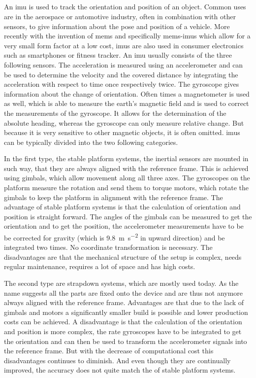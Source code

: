 \subsection{}
An \gls{imu} is used to track the orientation and position of an object.
Common uses are in the aerospace or automotive industry, often in combination with other sensors, to give information about the pose and position of a vehicle.
More recently with the invention of \gls{mems} and specifically \gls{mems}-\gls{imu}s which allow for a very small form factor at a low cost, \gls{imu}s are also used in consumer electronics such as smartphones or fitness tracker.
An \gls{imu} usually consists of the three following sensors.
The acceleration is measured using an accelerometer and can be used to determine the velocity and the covered distance by integrating the acceleration with respect to time once respectively twice.
The gyroscope gives information about the change of orientation.
Often times a magnetometer is used as well, which is able to measure the earth's magnetic field and is used to correct the measurements of the gyroscope.
It allows for the determination of the absolute heading, whereas the gyroscope can only measure relative change. But because it is very sensitive to other magnetic objects, it is often omitted.
\gls{imu}s can be typically divided into the two following categories.

In the first type, the stable platform systems, the inertial sensors are mounted in such way, that they are always aligned with the reference frame.
This is achieved using gimbals, which allow movement along all three axes.
The gyroscopes on the platform measure the rotation and send them to torque motors, which rotate the gimbals to keep the platform in alignment with the reference frame.
The advantage of stable platform systems is that the calculation of orientation and position is straight forward.
The angles of the gimbals can be measured to get the orientation and to get the position, the accelerometer measurements have to be be corrected for gravity (which is \SI{9.8}{\metre\per\second^2} in upward direction) and be integrated two times.
No coordinate transformation is necessary.
The disadvantages are that the mechanical structure of the setup is complex, needs regular maintenance, requires a lot of space and has high costs.

The second type are strapdown systems, which are mostly used today. 
As the name suggests all the parts are fixed onto the device and are thus not anymore always aligned with the reference frame.
Advantages are that due to the lack of gimbals and motors a significantly smaller build is possible and lower production costs can be achieved.
A disadvantage is that the calculation of the orientation and position is more complex, the rate gyroscopes have to be integrated to get the orientation and can then be used to transform the accelerometer signals into the reference frame.
But with the decrease of computational cost this disadvantages continues to diminish. And even though they are continually improved, the accuracy does not quite match the of stable platform systems.


